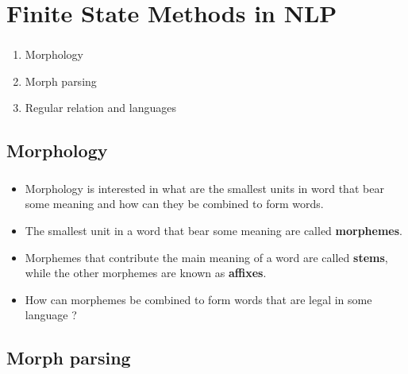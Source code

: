 \section{Finite State Methods in NLP}

\begin{frame}

	\begin{center}
		\Huge \insertsection
	\end{center}

\end{frame}


\begin{frame}

	\frametitle{\insertsection}
	
	\begin{enumerate}
		\item Morphology
		\item Morph parsing
		\item Regular relation and languages
	\end{enumerate}

\end{frame}


\subsection{Morphology}

\begin{frame}

	\frametitle{\insertsection}
	\framesubtitle{\insertsubsection}
	
	\begin{itemize}
		\item Morphology is interested in what are the smallest units in word that bear some meaning and how can they be combined to form words.
		\item The smallest unit in a word that bear some meaning are called \textbf{morphemes}.
		\item Morphemes that contribute the main meaning of a word are called \textbf{stems}, while the other morphemes are known as \textbf{affixes}.
		\item How can morphemes be combined to form words that are legal in some language ?
	\end{itemize}

\end{frame}

\subsection{Morph parsing}

